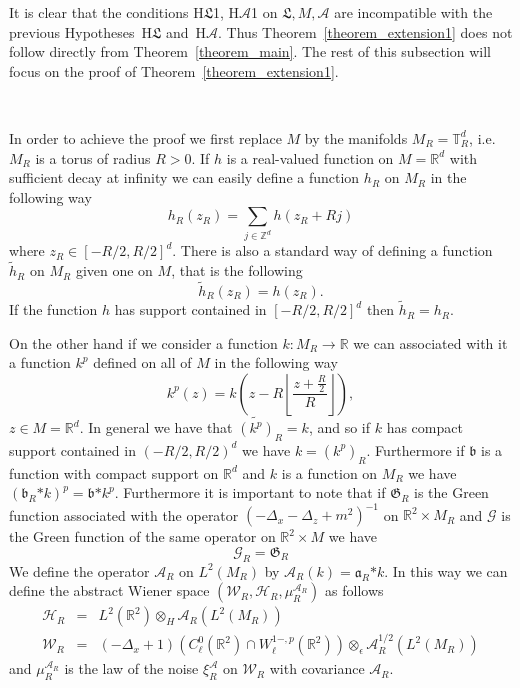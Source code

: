 \documentclass[a4paper,10pt]{article}
\newcommand{\asterisk}{\mathord{*}}
\begin{document}
It is clear that the conditions H$\mathfrak{L}$1, H$\mathcal{A}$1 on
$\mathfrak{L}, M, \mathcal{A}$ are incompatible with the previous
Hypotheses~H$\mathfrak{L}$ and~H$\mathcal{A}$. Thus
Theorem~\ref{theorem_extension1} does not follow directly from
Theorem~\ref{theorem_main}. The rest of this subsection will focus on the
proof of Theorem~\ref{theorem_extension1}.

\

In order to achieve the proof we first replace $M$ by the manifolds $M_R
=\mathbb{T}^d_R$, i.e. $M_R$ is a torus of radius $R > 0$. If $h$ is a
real-valued function on $M =\mathbb{R}^d$ with sufficient decay at infinity we
can easily define a function $h_R$ on $M_R$ in the following way
\[ h_R (z_R) = \sum_{j \in \mathbb{Z}^d} h (z_R + R j) \]
where $z_R \in [- R / 2, R / 2]^d$. There is also a standard way of defining a
function $\tilde{h}_R$ on $M_R$ given one on $M$, that is the following
\[ \tilde{h}_R (z_R) = h (z_R) . \]
If the function $h$ has support contained in $[- R / 2, R / 2]^d$ then
$\tilde{h}_R = h_R$.

On the other hand if we consider a function $k : M_R \rightarrow \mathbb{R}$
we can associated with it a function $k^p$ defined on all of $M$ in the
following way
\[ k^p (z) = k \left( z - R \left\lfloor \frac{z + \frac{R}{2}}{R}
   \right\rfloor \right), \]
$z \in M =\mathbb{R}^d$. In general we have that $\widetilde{(k^p)}_R = k$,
and so if $k$ has compact support contained in $(- R / 2, R / 2)^d$ we have $k
= (k^p)_R$. Furthermore if $\mathfrak{b}$ is a function with compact support
on $\mathbb{R}^d$ and $k$ is a function on $M_R$ we have $(\mathfrak{b}_R
\asterisk k)^p = \mathfrak{b} \asterisk k^p$. Furthermore it is important to
note that if $\mathfrak{G}_R$ is the Green function associated with the
operator $(- \Delta_x - \Delta_z + m^2)^{- 1}$ on $\mathbb{R}^2 \times M_R$
and $\mathcal{G}$ is the Green function of the same operator on $\mathbb{R}^2
\times M$ we have
\[ \mathcal{G}_R = \mathfrak{G}_R \]
We define the operator $\mathcal{A}_R$ on $L^2 (M_R)$ by $\mathcal{A}_R (k) =
\mathfrak{a}_R \asterisk k$. In this way we can define the abstract Wiener
space $(\mathcal{W}_R, \mathcal{H}_R, \mu^{\mathcal{A}_R}_R)$ as follows
\begin{eqnarray}
  \mathcal{H}_R & = & L^2 (\mathbb{R}^2) \otimes_H \mathcal{A}_R (L^2 (M_R))
  \nonumber\\
  \mathcal{W}_R & = & (- \Delta_x + 1) (C^0_{\ell} (\mathbb{R}^2) \cap W^{1 -,
  p}_{\ell} (\mathbb{R}^2)) \otimes_{\epsilon} \mathcal{A}_R^{1 / 2} (L^2
  (M_R)) \nonumber
\end{eqnarray}
and $\mu^{\mathcal{A}_R}_R$ is the law of the noise $\xi^{\mathcal{A}}_R$ on
$\mathcal{W}_R$ with covariance $\mathcal{A}_R$.
\end{document}
